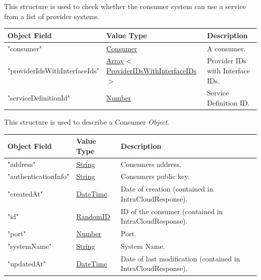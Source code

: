 \documentclass[a4paper]{arrowhead}
\newcommand{\mref}[1]{{\textcolor{ArrowheadPurple}{\hyperref[sec:model:#1]{#1}}}}
\newcommand{\pref}[1]{{\textcolor{ArrowheadGrey}{\hyperref[sec:model:primitives:#1]{#1}}}}
\begin{document}

This structure is used to check whether the consumer system can use a service from a list of provider systems.

\begin{table}[ht!]
\begin{tabularx}{\textwidth}{| p{5cm} | p{6cm} | X |} \hline
\rowcolor{gray!33} Object Field & Value Type      & Description \\ \hline
"consumer"                   & \pref{Consumer}     & A consumer. \\ \hline
"providerIdsWithInterfaceIds"  & \pref{Array}$<$\mref{ProviderIDsWithInterfaceIDs}$>$     & Provider IDs with Interface IDs. \\ \hline
"serviceDefinitionId"                & \pref{Number}     & Service Definition ID. \\ \hline

\end{tabularx}
\end{table}


This structure is used to describe a Consumer \textit{Object}.

\begin{table}[ht!]
\begin{tabularx}{\textwidth}{| p{5cm} | p{3.5cm} | X |} \hline
\rowcolor{gray!33} Object Field & Value Type      & Description \\ \hline
"address"             & \pref{String}     & Consumers address. \\ \hline
"authenticationInfo"  & \pref{String}     & Consumers public key. \\ \hline
"createdAt"           & \pref{DateTime}   & Date of creation (contained in IntraCloudResponse). \\ \hline
"id"                  & \pref{RandomID}     & ID of the consumer (contained in IntraCloudResponse). \\ \hline
"port"                & \pref{Number}     & Port. \\ \hline
"systemName"          & \pref{String}     & System Name. \\ \hline
"updatedAt"           & \pref{DateTime}   & Date of last modification (contained in IntraCloudResponse). \\ \hline

\end{tabularx}
\end{table}
\end{document}
